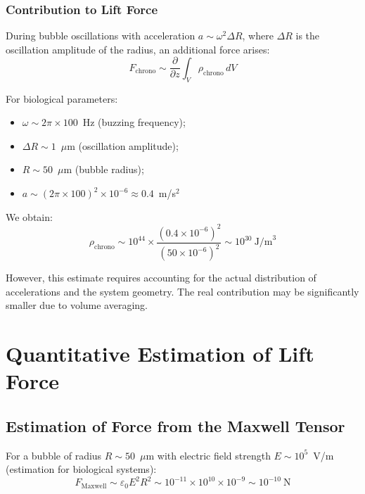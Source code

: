 \documentclass[12pt,a4paper]{article}
\begin{document}
\subsubsection{Contribution to Lift Force}

During bubble oscillations with acceleration $a \sim \omega^2 \Delta R$, where $\Delta R$ is the oscillation amplitude of the radius, an additional force arises:
\begin{equation}
    F_{\text{chrono}} \sim \frac{\partial}{\partial z} \int_V \rho_{\text{chrono}} \, dV
    \label{eq:chrono_force}
\end{equation}

For biological parameters:
\begin{itemize}
    \item $\omega \sim 2\pi \times 100$~Hz (buzzing frequency);
    \item $\Delta R \sim 1$~$\mu$m (oscillation amplitude);
    \item $R \sim 50$~$\mu$m (bubble radius);
    \item $a \sim (2\pi \times 100)^2 \times 10^{-6} \approx 0.4$~m/s$^2$
\end{itemize}

We obtain:
\begin{equation}
    \rho_{\text{chrono}} \sim 10^{44} \times \frac{(0.4 \times 10^{-6})^2}{(50 \times 10^{-6})^2} \sim 10^{30}~\text{J/m}^3
    \label{eq:chrono_estimate}
\end{equation}

However, this estimate requires accounting for the actual distribution of accelerations and the system geometry. The real contribution may be significantly smaller due to volume averaging.

\section{Quantitative Estimation of Lift Force}

\subsection{Estimation of Force from the Maxwell Tensor}

For a bubble of radius $R \sim 50$~$\mu$m with electric field strength $E \sim 10^5$~V/m (estimation for biological systems):
\begin{equation}
    F_{\text{Maxwell}} \sim \varepsilon_0 E^2 R^2 \sim 10^{-11} \times 10^{10} \times 10^{-9} \sim 10^{-10}~\text{N}
    \label{eq:maxwell_estimate}
\end{equation}
\end{document}
